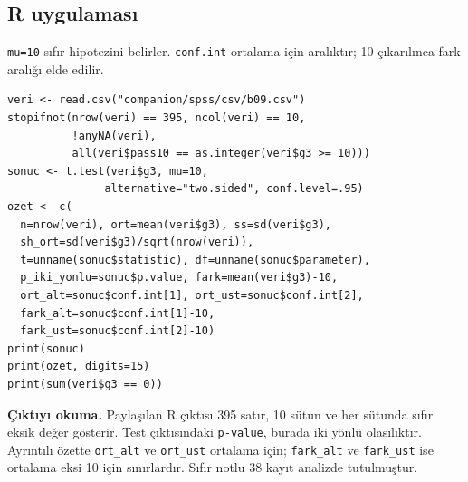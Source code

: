 \par\noindent\begin{minipage}{\linewidth}
\subsection{R uygulaması}
\label{sec:r-gercek-b09}

\texttt{mu=10} sıfır hipotezini belirler. \texttt{conf.int} ortalama için aralıktır; 10 çıkarılınca fark aralığı elde edilir.

\begin{lstlisting}[style=prismR]
veri <- read.csv("companion/spss/csv/b09.csv")
stopifnot(nrow(veri) == 395, ncol(veri) == 10,
          !anyNA(veri),
          all(veri$pass10 == as.integer(veri$g3 >= 10)))
sonuc <- t.test(veri$g3, mu=10,
               alternative="two.sided", conf.level=.95)
ozet <- c(
  n=nrow(veri), ort=mean(veri$g3), ss=sd(veri$g3),
  sh_ort=sd(veri$g3)/sqrt(nrow(veri)),
  t=unname(sonuc$statistic), df=unname(sonuc$parameter),
  p_iki_yonlu=sonuc$p.value, fark=mean(veri$g3)-10,
  ort_alt=sonuc$conf.int[1], ort_ust=sonuc$conf.int[2],
  fark_alt=sonuc$conf.int[1]-10,
  fark_ust=sonuc$conf.int[2]-10)
print(sonuc)
print(ozet, digits=15)
print(sum(veri$g3 == 0))
\end{lstlisting}

\textbf{Çıktıyı okuma.} Paylaşılan R çıktısı 395 satır, 10 sütun ve
her sütunda sıfır eksik değer gösterir. Test çıktısındaki
\texttt{p-value}, burada iki yönlü olasılıktır. Ayrıntılı özette
\texttt{ort\_alt} ve \texttt{ort\_ust} ortalama için;
\texttt{fark\_alt} ve \texttt{fark\_ust} ise ortalama eksi 10 için
sınırlardır. Sıfır notlu 38 kayıt analizde tutulmuştur.
\end{minipage}\par

